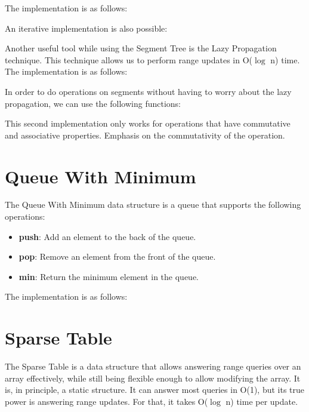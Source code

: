 The implementation is as follows:



An iterative implementation is also possible:




Another useful tool while using the Segment Tree is the Lazy Propagation technique. This technique allows us to perform range updates in O($\log$ n) time. The implementation is as follows:





In order to do operations on segments without having to worry about the lazy propagation, we can use the following functions:



This second implementation only works for operations that have commutative and associative properties. Emphasis on the commutativity of the operation.

\section{Queue With Minimum}

The Queue With Minimum data structure is a queue that supports the following operations:

\begin{itemize}
\item \textbf{push}: Add an element to the back of the queue.
\item \textbf{pop}: Remove an element from the front of the queue.
\item \textbf{min}: Return the minimum element in the queue.
\end{itemize}

The implementation is as follows:




\section{Sparse Table}

The Sparse Table is a data structure that allows answering range queries over an array effectively, while still being flexible enough to allow modifying the array. It is, in principle, a static structure. It can answer most queries in O(1), but its true power is answering range updates. For that, it takes O($\log$ n) time per update.

